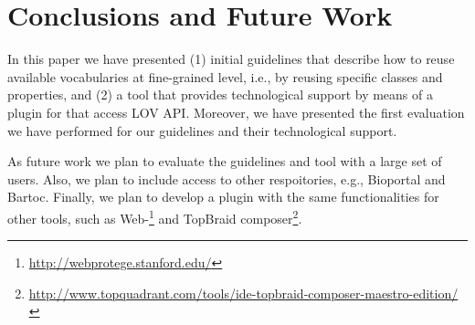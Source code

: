\section{Conclusions and Future Work}
\label{sec:conclusions}
In this paper we have presented (1) initial guidelines that describe how to reuse available vocabularies at fine-grained level, i.e., by reusing specific classes and properties, and (2) a tool that provides technological support by means of a plugin for \protege that access LOV API. Moreover, we have presented the first evaluation we have performed for our guidelines and their technological support.


As future work we plan to evaluate the guidelines and tool with a large set of users. Also, we plan to include access to other respoitories, e.g., Bioportal and Bartoc. Finally, we plan to develop a plugin with the same functionalities for other tools, such as  Web-\protege\footnote{\url{http://webprotege.stanford.edu/}} and TopBraid composer\footnote{\url{http://www.topquadrant.com/tools/ide-topbraid-composer-maestro-edition/}}.



